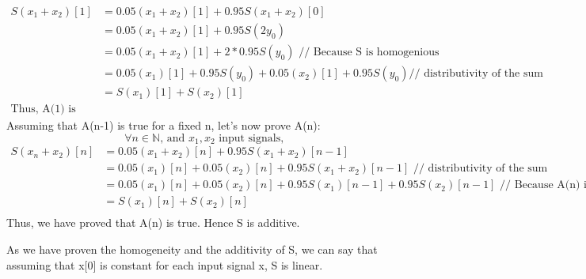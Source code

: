 \documentclass[a4paper,10pt]{article}
\begin{document}
\begin{itemize}
		\begin{equation*}
		\begin{aligned}
		    S(x_{1} + x_{2})[1]
		    &= 0.05 (x_{1}+x_{2})[1] + 0.95 S(x_{1}+x_{2})[0]\\
		    &= 0.05 (x_{1}+x_{2})[1] + 0.95 S(2 y_{0})\\
		    &= 0.05 (x_{1}+x_{2})[1] + 2*0.95 S(y_{0})\mbox{ // Because S is homogenious}\\
		    &= 0.05 (x_{1})[1] + 0.95 S(y_{0}) + 0.05 (x_{2})[1] + 0.95 S(y_{0})\mbox{// distributivity of the sum}\\
		    &= S(x_{1})[1] + S(x_{2})[1]\\
		    \mbox{Thus, A(1) is true}
		\end{aligned}
		\end{equation*}
		Assuming that A(n-1) is true for a fixed n, let's now prove A(n):
		\begin{equation} \forall n \in  \mathbb{N}\mbox{, and } x_{1}, x_{2}\mbox{ input signals,  }\end{equation}
		\begin{equation*}
		\begin{aligned}
		    S(x_{n} + x_{2})[n]
		    &= 0.05 (x_{1}+x_{2})[n] + 0.95 S(x_{1}+x_{2})[n-1]\\
		    &= 0.05 (x_{1})[n] + 0.05 (x_{2})[n] + 0.95 S(x_{1}+x_{2})[n-1] \mbox{ // distributivity of the sum}\\
		    &= 0.05 (x_{1})[n] + 0.05 (x_{2})[n] + 0.95 S(x_{1})[n-1] + 0.95 S(x_{2})[n-1] \mbox{ // Because A(n) is true}\\
		    &= S(x_{1})[n] + S(x_{2})[n]\\
		\end{aligned}
		\end{equation*}
		Thus, we have proved that A(n) is true.\newline
		Hence S is additive.
	\end{itemize}
	As we have proven the homogeneity and the additivity of S, we can say that assuming that x[0] is constant for each input signal x, S is linear.
\end{document}

